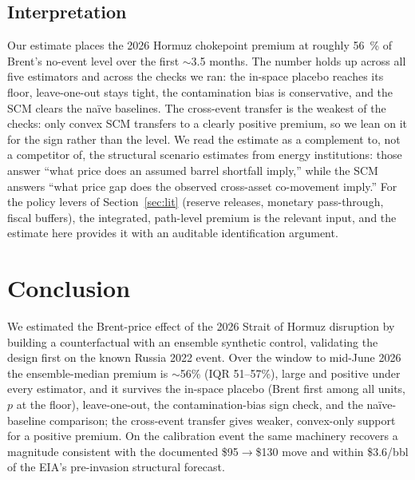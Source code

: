 \documentclass[11pt,a4paper]{article}
\begin{document}
\subsection{Interpretation}
Our estimate places the 2026 Hormuz chokepoint premium at roughly \SI{56}{\percent} of
Brent's no-event level over the first $\sim$3.5 months. The number holds up across all five
estimators and across the checks we ran: the in-space placebo reaches its floor,
leave-one-out stays tight, the contamination bias is conservative, and the SCM clears
the na\"ive baselines. The cross-event transfer is the weakest of the checks: only convex
SCM transfers to a clearly positive premium, so we lean on it for the sign rather than the
level. We read the estimate as a complement to, not a competitor of, the
structural scenario estimates from energy institutions: those answer ``what price does
an assumed barrel shortfall imply,'' while the SCM answers ``what price gap does the
observed cross-asset co-movement imply.''
For the policy levers of Section~\ref{sec:lit} (reserve releases, monetary pass-through,
fiscal buffers), the integrated, path-level premium is the relevant input, and the
estimate here provides it with an auditable identification argument.

\section{Conclusion}\label{sec:conclusion}
We estimated the Brent-price effect of the 2026 Strait of Hormuz disruption by building a
counterfactual with an ensemble synthetic control, validating the design first on the known
Russia 2022 event. Over the window to mid-June 2026 the ensemble-median premium is
$\sim$56\% (IQR 51--57\%), large and positive under every estimator, and it survives the
in-space placebo (Brent first among all units, $p$ at the floor), leave-one-out, the
contamination-bias sign check, and the na\"ive-baseline comparison; the cross-event transfer
gives weaker, convex-only support for a positive premium. On the calibration event the same
machinery recovers a magnitude consistent with the documented \$95$\to$\$130 move and within
\$3.6/bbl of the EIA's pre-invasion structural forecast.
\end{document}
